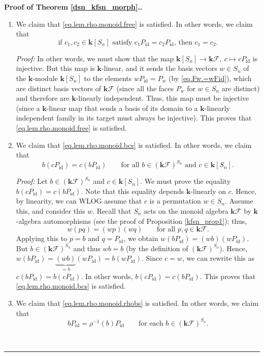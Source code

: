 \documentclass[12pt]{article}
\theoremstyle{definition}%
\theoremstyle{definition}%
\theoremstyle{remark}%
\newcommand{\tup}[1]{\left( #1 \right)}
\newcommand{\kk}{\mathbf{k}}
\newcommand{\ksn}{\kk\left[S_n\right]}
\newcommand{\kf}{\kk\mathcal{F}}
\newcommand{\kfsn}{\left(\kf\right)^{S_n}}
\newcommand{\id}{\operatorname{id}}
\newenvironment{proof}[1][Proof]{\noindent\textbf{#1.} }{\ \rule{0.5em}{0.5em}}
\begin{document}
\begin{proof}[Proof of Theorem \ref{dsn_kfsn_morph}.]
\begin{enumerate}
\item We claim that \eqref{eq.lem.rho.monoid.free} is satisfied. In other
words, we claim that
\[
\text{if }c_{1},c_{2}\in\ksn  \text{ satisfy }
c_{1}P_{\id} = c_{2}P_{\id}\text{, then }
c_{1} = c_{2}\text{.}
\]


\textit{Proof:} In other words, we must show that
the map $\ksn \to \kf,\ c\mapsto cP_{\id}$ is
injective. But this map is $\kk$-linear, and it sends the basis vectors
$w\in S_n$ of the $\kk$-module $\ksn$ to
the elements $wP_{\id}=P_{w}$ (by \eqref{eq.Fw.=wFid}), which
are distinct basis vectors of $\kf$ (since all the faces
$P_{w}$ for $w\in S_n$ are distinct) and therefore are $\kk$-linearly
independent. Thus, this map must be injective (since a $\kk$-linear map
that sends a basis of its domain to a $\kk$-linearly independent family
in its target must always be injective).
This proves that \eqref{eq.lem.rho.monoid.free} is satisfied.

\item We claim that \eqref{eq.lem.rho.monoid.bcs} is satisfied. In other
words, we claim that
\[
b\left(  cP_{\id}\right)  =c\left(  bP_{\id}\right)
\qquad \text{for all } b\in\kfsn \text{ and } c\in\ksn .
\]


\textit{Proof:} Let $b\in\kfsn$ and
$c\in\ksn$. We must prove the equality $b\left(
cP_{\id}\right)  =c\left(  bP_{\id}\right)$.
Note that this equality depends $\kk$-linearly on $c$. Hence, by
linearity, we can WLOG assume that $c$ is a permutation $w\in S_n$. Assume
this, and consider this $w$. Recall that $S_n$ acts on the monoid algebra
$\kf$ by $\kk$-algebra automorphisms (see the proof
of Proposition \ref{kfsn_prop1}); thus,
\[
w\left(  pq\right)  =\left(  wp\right)  \left(  wq\right)
\qquad\text{for all }p,q\in\kf.
\]
Applying this to $p=b$ and $q=P_{\id}$, we obtain $w\left(
bP_{\id}\right)  =\left(  wb\right)  \left(
wP_{\id}\right)$. But $b\in\kfsn$ and thus $wb=b$
(by the definition of $\kfsn$). Hence, $w\left(
bP_{\id}\right)  =\underbrace{\left(  wb\right)  }_{=b}\left(
wP_{\id}\right)  =b\left(  wP_{\id}\right)$.
Since $c=w$, we can rewrite this as $c\left(  bP_{\id}\right)
=b\left(  cP_{\id}\right)$. In other words, $b\left(
cP_{\id}\right)  =c\left(  bP_{\id}\right)$.
This proves that \eqref{eq.lem.rho.monoid.bcs} is satisfied.

\item We claim that \eqref{eq.lem.rho.monoid.rhobs} is satisfied.
In other words, we claim that
\[
bP_{\id}=\rho^{-1}\tup{b}   P_{\id}
\qquad\text{for each }b\in\kfsn.
\]



\end{enumerate}
\end{proof}
\end{document}
